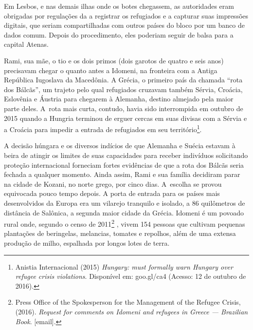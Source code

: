 Em Lesbos, e nas demais ilhas onde os botes chegassem, as autoridades
eram obrigadas por regulações da  a registrar os refugiados e a
capturar suas impressões digitais, que seriam compartilhadas com outros
países do bloco por um banco de dados comum. Depois do procedimento,
eles poderiam seguir de balsa para a capital Atenas.

Rami, sua mãe, o tio e os dois primos (dois garotos de quatro e seis
anos) precisavam chegar o quanto antes a Idomeni, na fronteira com a Antiga República Iugoslava da Macedônia.
% 
% 
A Grécia, o primeiro país da chamada ``rota dos Bálcãs'', um trajeto pelo qual
refugiados cruzavam também Sérvia, Croácia, Eslovênia e Áustria para
chegarem à Alemanha, destino almejado pela maior parte deles. A~rota
mais curta, contudo, havia sido interrompida em outubro de 2015 quando a
Hungria terminou de erguer cercas em suas divisas com a Sérvia e a
Croácia para impedir a entrada de refugiados em seu
território\footnote{ Anistia Internacional (2015) \emph{Hungary:  must
formally warn Hungary over refugee crisis violations}. Disponível em:
goo.gl/ca4
(Acesso: 12 de outubro de 2016).}.

A decisão húngara e os diversos indícios de que Alemanha e Suécia
estavam à beira de atingir os limites de suas capacidades para receber
indivíduos solicitando proteção internacional forneciam fortes
evidências de que a rota dos Bálcãs seria fechada a qualquer momento.
Ainda assim, Rami e sua família decidiram parar na cidade de Kozani, no
norte grego, por cinco dias. A~escolha se provou equivocada pouco
tempo depois.
% 
% 
% 
A porta de entrada para os países mais desenvolvidos da Europa era um
vilarejo tranquilo e isolado, a 86 quilômetros de distância de Salônica,
a segunda maior cidade da Grécia. Idomeni é um povoado rural onde,
segundo o censo de 2011\footnote{ Press Office of the Spokesperson for the Management
of the Refugee Crisis, (2016). \emph{Request for comments on Idomeni and
refugees in Greece --- Brazilian Book}. {[}email{]}.} , vivem 154 pessoas que
cultivam pequenas plantações de beringelas, melancias, tomates e
repolhos, além de uma extensa produção de milho, espalhada por longos
lotes de terra.

